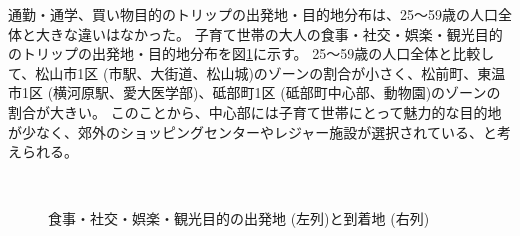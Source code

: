 \documentclass[a4paper,12pt, uplatex]{jsbook}
\begin{document}
通勤・通学、買い物目的のトリップの出発地・目的地分布は、25〜59歳の人口全体と大きな違いはなかった。
子育て世帯の大人の食事・社交・娯楽・観光目的のトリップの出発地・目的地分布を図\ref{fig:od_leisure_parent}に示す。
25〜59歳の人口全体と比較して、松山市1区 (市駅、大街道、松山城)のゾーンの割合が小さく、松前町、東温市1区 (横河原駅、愛大医学部)、砥部町1区 (砥部町中心部、動物園)のゾーンの割合が大きい。
このことから、中心部には子育て世帯にとって魅力的な目的地が少なく、郊外のショッピングセンターやレジャー施設が選択されている、と考えられる。
%
\begin{figure}[htbp]
  \centering
  \\%
    \caption{食事・社交・娯楽・観光目的の出発地 (左列)と到着地 (右列)}
  	\label{fig:od_leisure_parent}
\end{figure}
\end{document}
